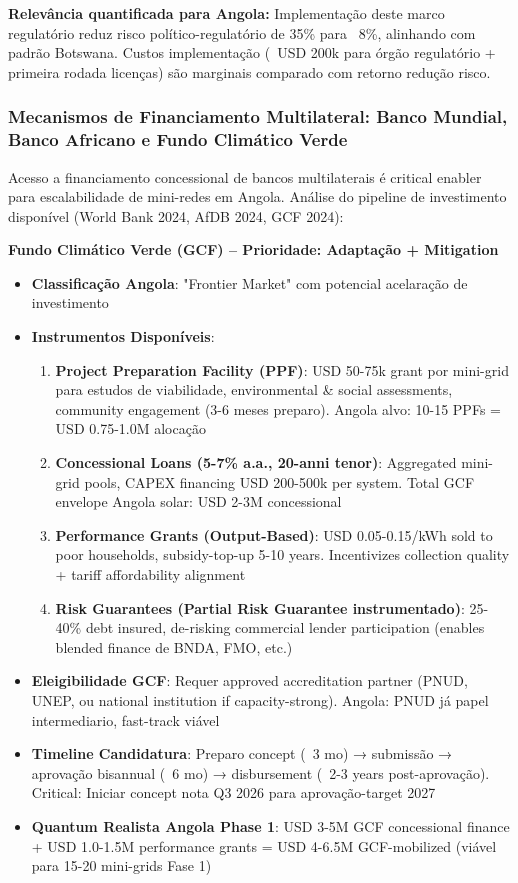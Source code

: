 \documentclass[12pt, a4paper]{article}
\begin{document}
\textbf{Relevância quantificada para Angola:} Implementação deste marco regulatório reduz risco político-regulatório de 35\% para ~8\%, alinhando com padrão Botswana. Custos implementação (~USD 200k para órgão regulatório + primeira rodada licenças) são marginais comparado com retorno redução risco.

\subsubsection{Mecanismos de Financiamento Multilateral: Banco Mundial, Banco Africano e Fundo Climático Verde}

Acesso a financiamento concessional de bancos multilaterais é critical enabler para escalabilidade de mini-redes em Angola. Análise do pipeline de investimento disponível (World Bank 2024, AfDB 2024, GCF 2024):

\textbf{Fundo Climático Verde (GCF) – Prioridade: Adaptação + Mitigation}
\begin{itemize}
\item \textbf{Classificação Angola}: "Frontier Market" com potencial acelaração de investimento
\item \textbf{Instrumentos Disponíveis}:
  \begin{enumerate}
  \item \textbf{Project Preparation Facility (PPF)}: USD 50-75k grant por mini-grid para estudos de viabilidade, environmental \& social assessments, community engagement (3-6 meses preparo). Angola alvo: 10-15 PPFs = USD 0.75-1.0M alocação
  \item \textbf{Concessional Loans (5-7\% a.a., 20-anni tenor)}: Aggregated mini-grid pools, CAPEX financing USD 200-500k per system. Total GCF envelope Angola solar: USD 2-3M concessional
  \item \textbf{Performance Grants (Output-Based)}: USD 0.05-0.15/kWh sold to poor households, subsidy-top-up 5-10 years. Incentivizes collection quality + tariff affordability alignment
  \item \textbf{Risk Guarantees (Partial Risk Guarantee instrumentado)}: 25-40\% debt insured, de-risking commercial lender participation (enables blended finance de BNDA, FMO, etc.)
  \end{enumerate}
\item \textbf{Eleigibilidade GCF}: Requer approved accreditation partner (PNUD, UNEP, ou national institution if capacity-strong). Angola: PNUD já papel intermediario, fast-track viável
\item \textbf{Timeline Candidatura}: Preparo concept (~3 mo) → submissão → aprovação bisannual (~6 mo) → disbursement (~2-3 years post-aprovação). Critical: Iniciar concept nota Q3 2026 para aprovação-target 2027
\item \textbf{Quantum Realista Angola Phase 1}: USD 3-5M GCF concessional finance + USD 1.0-1.5M performance grants = USD 4-6.5M GCF-mobilized (viável para 15-20 mini-grids Fase 1)
\end{itemize}
\end{document}
